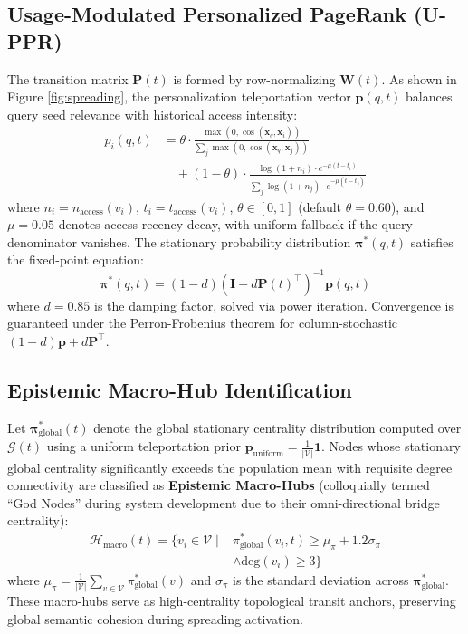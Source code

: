 \documentclass[conference]{IEEEtran}
\begin{document}
\subsection{Usage-Modulated Personalized PageRank (U-PPR)}
The transition matrix $\mathbf{P}(t)$ is formed by row-normalizing $\mathbf{W}(t)$. As shown in Figure \ref{fig:spreading}, the personalization teleportation vector $\mathbf{p}(q, t)$ balances query seed relevance with historical access intensity:
\begin{equation}
\begin{aligned}
p_i(q, t) &= \theta \cdot \frac{\max\left(0, \cos(\mathbf{x}_q, \mathbf{x}_i)\right)}{\sum_j \max\left(0, \cos(\mathbf{x}_q, \mathbf{x}_j)\right)} \\
&\quad + (1 - \theta) \cdot \frac{\log(1 + n_i) \cdot e^{-\mu(t - t_i)}}{\sum_j \log(1 + n_j) \cdot e^{-\mu(t - t_j)}}
\end{aligned}
\end{equation}
where $n_i = n_{\text{access}}(v_i)$, $t_i = t_{\text{access}}(v_i)$, $\theta \in [0, 1]$ (default $\theta = 0.60$), and $\mu = 0.05$ denotes access recency decay, with uniform fallback if the query denominator vanishes. The stationary probability distribution $\mathbf{\pi}^*(q, t)$ satisfies the fixed-point equation:
\begin{equation}
\mathbf{\pi}^*(q, t) = (1 - d)\left(\mathbf{I} - d \mathbf{P}(t)^\top\right)^{-1} \mathbf{p}(q, t)
\end{equation}
where $d = 0.85$ is the damping factor, solved via power iteration. Convergence is guaranteed under the Perron-Frobenius theorem for column-stochastic $(1-d)\mathbf{p} + d \mathbf{P}^\top$.

\subsection{Epistemic Macro-Hub Identification}
Let $\mathbf{\pi}_{\text{global}}^*(t)$ denote the global stationary centrality distribution computed over $\mathcal{G}(t)$ using a uniform teleportation prior $\mathbf{p}_{\text{uniform}} = \frac{1}{|\mathcal{V}|}\mathbf{1}$. Nodes whose stationary global centrality significantly exceeds the population mean with requisite degree connectivity are classified as \textbf{Epistemic Macro-Hubs} (colloquially termed ``God Nodes'' during system development due to their omni-directional bridge centrality):
\begin{equation}
\begin{aligned}
\mathcal{H}_{\text{macro}}(t) = \big\{ v_i \in \mathcal{V} \;\big|\; &\pi_{\text{global}}^*(v_i, t) \ge \mu_\pi + 1.2\sigma_\pi \\
&\land \text{deg}(v_i) \ge 3 \big\}
\end{aligned}
\end{equation}
where $\mu_\pi = \frac{1}{|\mathcal{V}|}\sum_{v \in \mathcal{V}} \pi_{\text{global}}^*(v)$ and $\sigma_\pi$ is the standard deviation across $\mathbf{\pi}_{\text{global}}^*$. These macro-hubs serve as high-centrality topological transit anchors, preserving global semantic cohesion during spreading activation.
\end{document}
